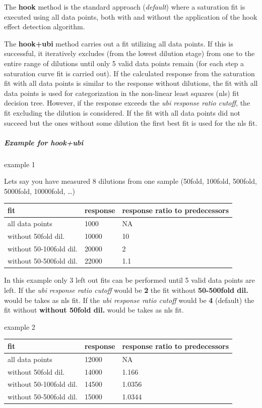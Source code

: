 \documentclass[
]{book}
\begin{document}
The \textbf{hook} method is the standard approach (\emph{default}) where a saturation fit is executed using all data points, both with and without the application of the hook effect detection algorithm.

The \textbf{hook+ubi} method carries out a fit utilizing all data points. If this is successful, it iteratively excludes (from the lowest dilution stage) from one to the entire range of dilutions until only 5 valid data points remain (for each step a saturation curve fit is carried out). If the calculated response from the saturation fit with all data points is similar to the response without dilutions, the fit with all data points is used for categorization in the non-linear least squares (nls) fit decision tree. However, if the response exceeds the \emph{ubi response ratio cutoff}, the fit excluding the dilution is considered.
If the fit with all data points did not succeed but the ones without some dilution the first best fit is used for the nls fit.

\hypertarget{example-for-hookubi}{%
\subparagraph{\texorpdfstring{Example for \textbf{hook+ubi}}{Example for hook+ubi}}\label{example-for-hookubi}}

example 1

Lets say you have measured 8 dilutions from one sample (50fold, 100fold, 500fold, 5000fold, 10000fold, \ldots)

\begin{longtable}[]{@{}lll@{}}
\toprule\noalign{}
fit & response & response ratio to predecessors \\
\midrule\noalign{}
\endhead
\bottomrule\noalign{}
\endlastfoot
all data points & 1000 & NA \\
without 50fold dil. & 10000 & 10 \\
without 50-100fold dil. & 20000 & 2 \\
without 50-500fold dil. & 22000 & 1.1 \\
\end{longtable}

In this example only 3 left out fits can be performed until 5 valid data points are left.
If the \emph{ubi response ratio cutoff} would be \textbf{2} the fit without \textbf{50-500fold dil.} would be takes as nls fit.
If the \emph{ubi response ratio cutoff} would be \textbf{4} (default) the fit without \textbf{without 50fold dil.} would be takes as nls fit.

example 2

\begin{longtable}[]{@{}lll@{}}
\toprule\noalign{}
fit & response & response ratio to predecessors \\
\midrule\noalign{}
\endhead
\bottomrule\noalign{}
\endlastfoot
all data points & 12000 & NA \\
without 50fold dil. & 14000 & 1.166 \\
without 50-100fold dil. & 14500 & 1.0356 \\
without 50-500fold dil. & 15000 & 1.0344 \\
\end{longtable}
\end{document}
